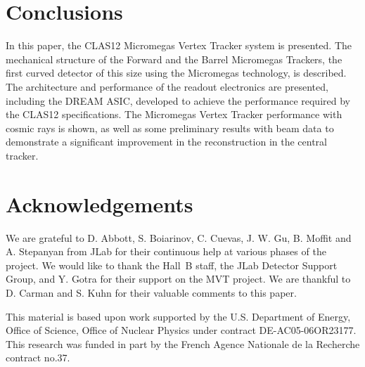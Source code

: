 \section{Conclusions}

In this paper, the CLAS12 Micromegas Vertex Tracker system is presented. The mechanical structure of the
Forward and the Barrel Micromegas Trackers, the first curved detector of this size using the Micromegas technology,
is described. The architecture and performance of the readout electronics are presented, including the DREAM ASIC,
developed to achieve the performance required by the CLAS12 specifications. The Micromegas Vertex Tracker
performance with cosmic rays is shown, as well as some preliminary results with beam data to demonstrate a significant
improvement in the reconstruction in the central tracker.

\section{Acknowledgements}

We are grateful to D. Abbott, S. Boiarinov, C. Cuevas, J. W. Gu, B. Moffit and A. Stepanyan from JLab for their continuous help at various phases of the project.
We would like to thank the Hall~B staff, the JLab Detector Support Group, and Y. Gotra for their support on the MVT project. We are thankful to D. Carman and S. Kuhn for their valuable comments to this paper.

This material is based upon work supported by the U.S. Department of Energy, Office of Science, Office of Nuclear 
Physics under contract DE-AC05-06OR23177.
This research was funded in part by the French Agence Nationale de la Recherche contract no.37.